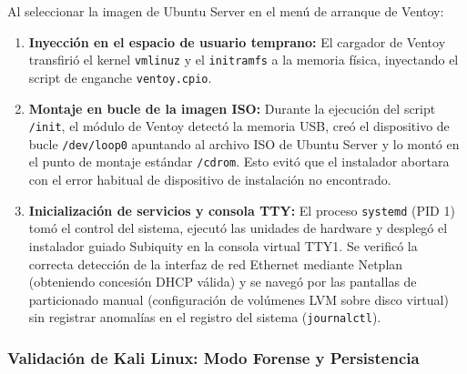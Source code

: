 \documentclass[12pt]{article}
\begin{document}
Al seleccionar la imagen de Ubuntu Server en el menú de arranque de Ventoy:
\begin{enumerate}[noitemsep, topsep=2pt]
    \item \textbf{Inyección en el espacio de usuario temprano:} El cargador de Ventoy transfirió el kernel \texttt{vmlinuz} y el \texttt{initramfs} a la memoria física, inyectando el script de enganche \texttt{ventoy.cpio}.
    \item \textbf{Montaje en bucle de la imagen ISO:} Durante la ejecución del script \texttt{/init}, el módulo de Ventoy detectó la memoria USB, creó el dispositivo de bucle \texttt{/dev/loop0} apuntando al archivo ISO de Ubuntu Server y lo montó en el punto de montaje estándar \texttt{/cdrom}. Esto evitó que el instalador abortara con el error habitual de dispositivo de instalación no encontrado.
    \item \textbf{Inicialización de servicios y consola TTY:} El proceso \texttt{systemd} (PID 1) tomó el control del sistema, ejecutó las unidades de hardware y desplegó el instalador guiado Subiquity en la consola virtual TTY1. Se verificó la correcta detección de la interfaz de red Ethernet mediante Netplan (obteniendo concesión DHCP válida) y se navegó por las pantallas de particionado manual (configuración de volúmenes LVM sobre disco virtual) sin registrar anomalías en el registro del sistema (\texttt{journalctl}).
\end{enumerate}

\subsubsection{Validación de Kali Linux: Modo Forense y Persistencia}
\end{document}
